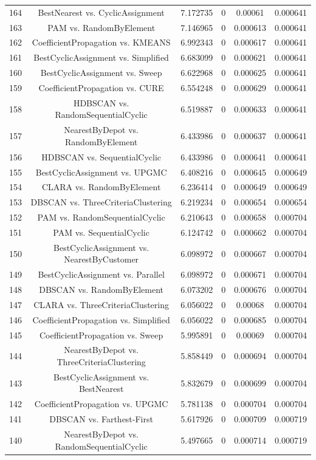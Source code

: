 \documentclass[a4paper,10pt]{article}
\begin{document}
\begin{landscape}
\begin{table}[!htp]
\begin{tabular}{cccccc}
164&BestNearest vs. CyclicAssignment&7.172735&0&0.00061&0.000641\\
163&PAM vs. RandomByElement&7.146965&0&0.000613&0.000641\\
162&CoefficientPropagation vs. KMEANS&6.992343&0&0.000617&0.000641\\
161&BestCyclicAssignment vs. Simplified&6.683099&0&0.000621&0.000641\\
160&BestCyclicAssignment vs. Sweep&6.622968&0&0.000625&0.000641\\
159&CoefficientPropagation vs. CURE&6.554248&0&0.000629&0.000641\\
158&HDBSCAN vs. RandomSequentialCyclic&6.519887&0&0.000633&0.000641\\
157&NearestByDepot vs. RandomByElement&6.433986&0&0.000637&0.000641\\
156&HDBSCAN vs. SequentialCyclic&6.433986&0&0.000641&0.000641\\
155&BestCyclicAssignment vs. UPGMC&6.408216&0&0.000645&0.000649\\
154&CLARA vs. RandomByElement&6.236414&0&0.000649&0.000649\\
153&DBSCAN vs. ThreeCriteriaClustering&6.219234&0&0.000654&0.000654\\
152&PAM vs. RandomSequentialCyclic&6.210643&0&0.000658&0.000704\\
151&PAM vs. SequentialCyclic&6.124742&0&0.000662&0.000704\\
150&BestCyclicAssignment vs. NearestByCustomer&6.098972&0&0.000667&0.000704\\
149&BestCyclicAssignment vs. Parallel&6.098972&0&0.000671&0.000704\\
148&DBSCAN vs. RandomByElement&6.073202&0&0.000676&0.000704\\
147&CLARA vs. ThreeCriteriaClustering&6.056022&0&0.00068&0.000704\\
146&CoefficientPropagation vs. Simplified&6.056022&0&0.000685&0.000704\\
145&CoefficientPropagation vs. Sweep&5.995891&0&0.00069&0.000704\\
144&NearestByDepot vs. ThreeCriteriaClustering&5.858449&0&0.000694&0.000704\\
143&BestCyclicAssignment vs. BestNearest&5.832679&0&0.000699&0.000704\\
142&CoefficientPropagation vs. UPGMC&5.781138&0&0.000704&0.000704\\
141&DBSCAN vs. Farthest-First&5.617926&0&0.000709&0.000719\\
140&NearestByDepot vs. RandomSequentialCyclic&5.497665&0&0.000714&0.000719\\

\end{tabular}
\end{table}
\end{landscape}
\end{document}
